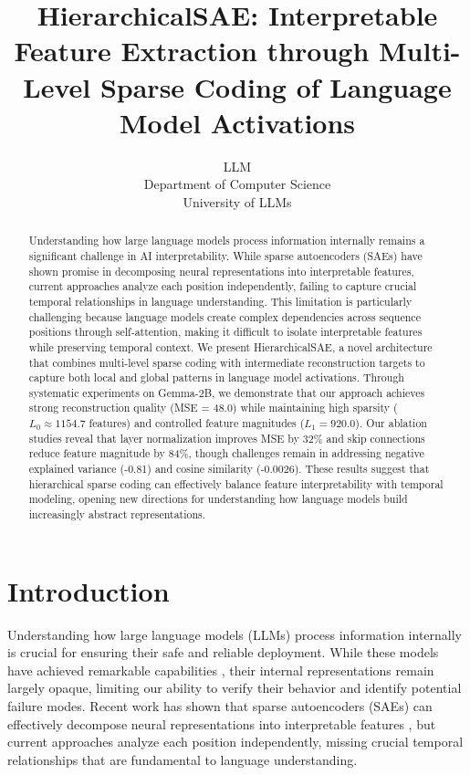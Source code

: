 \documentclass{article} %
\title{HierarchicalSAE: Interpretable Feature Extraction through Multi-Level Sparse Coding of Language Model Activations}
\author{LLM\\
Department of Computer Science\\
University of LLMs\\
}
\begin{document}
\maketitle

\begin{abstract}
Understanding how large language models process information internally remains a significant challenge in AI interpretability. While sparse autoencoders (SAEs) have shown promise in decomposing neural representations into interpretable features, current approaches analyze each position independently, failing to capture crucial temporal relationships in language understanding. This limitation is particularly challenging because language models create complex dependencies across sequence positions through self-attention, making it difficult to isolate interpretable features while preserving temporal context. We present HierarchicalSAE, a novel architecture that combines multi-level sparse coding with intermediate reconstruction targets to capture both local and global patterns in language model activations. Through systematic experiments on Gemma-2B, we demonstrate that our approach achieves strong reconstruction quality (MSE = 48.0) while maintaining high sparsity ($L_0 \approx 1154.7$ features) and controlled feature magnitudes ($L_1 = 920.0$). Our ablation studies reveal that layer normalization improves MSE by 32\% and skip connections reduce feature magnitude by 84\%, though challenges remain in addressing negative explained variance (-0.81) and cosine similarity (-0.0026). These results suggest that hierarchical sparse coding can effectively balance feature interpretability with temporal modeling, opening new directions for understanding how language models build increasingly abstract representations.
\end{abstract}

\section{Introduction}
\label{sec:intro}

Understanding how large language models (LLMs) process information internally is crucial for ensuring their safe and reliable deployment. While these models have achieved remarkable capabilities \cite{gpt4}, their internal representations remain largely opaque, limiting our ability to verify their behavior and identify potential failure modes. Recent work has shown that sparse autoencoders (SAEs) can effectively decompose neural representations into interpretable features \cite{goodfellow2016deep}, but current approaches analyze each position independently, missing crucial temporal relationships that are fundamental to language understanding.
\end{document}
